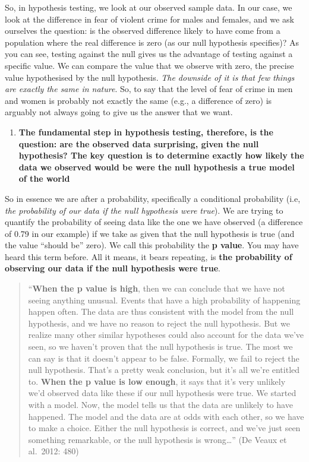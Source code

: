 \documentclass[
]{book}
\providecommand{\tightlist}{%
  \setlength{\itemsep}{0pt}\setlength{\parskip}{0pt}}
\begin{document}
So, in hypothesis testing, we look at our observed sample data. In our case, we look at the difference in fear of violent crime for males and females, and we ask ourselves the question: is the observed difference likely to have come from a population where the real difference is zero (as our null hypothesis specifies)? As you can see, testing against the null gives us the advantage of testing against a specific value. We can compare the value that we observe with zero, the precise value hypothesised by the null hypothesis. \emph{The downside of it is that few things are exactly the same in nature}. So, to say that the level of fear of crime in men and women is probably not exactly the same (e.g., a difference of zero) is arguably not always going to give us the answer that we want.

\begin{enumerate}
\def\labelenumi{\arabic{enumi}.}
\setcounter{enumi}{3}
\tightlist
\item
  \textbf{The fundamental step in hypothesis testing, therefore, is the question: are the observed data surprising, given the null hypothesis? The key question is to determine exactly how likely the data we observed would be were the null hypothesis a true model of the world}
\end{enumerate}

So in essence we are after a probability, specifically a conditional probability (i.e, \emph{the probability of our data if the null hypothesis were true}). We are trying to quantify the probability of seeing data like the one we have observed (a difference of 0.79 in our example) if we take as given that the null hypothesis is true (and the value ``should be'' zero). We call this probability the \textbf{p value}. You may have heard this term before. All it means, it bears repeating, is \textbf{the probability of observing our data if the null hypothesis were true}.

\begin{quote}
``\textbf{When the p value is high}, then we can conclude that we have not seeing anything unusual. Events that have a high probability of happening happen often. The data are thus consistent with the model from the null hypothesis, and we have no reason to reject the null hypothesis. But we realize many other similar hypotheses could also account for the data we've seen, so we haven't proven that the null hypothesis is true. The most we can say is that it doesn't appear to be false. Formally, we fail to reject the null hypothesis. That's a pretty weak conclusion, but it's all we're entitled to. \textbf{When the p value is low enough}, it says that it's very unlikely we'd observed data like these if our null hypothesis were true. We started with a model. Now, the model tells us that the data are unlikely to have happened. The model and the data are at odds with each other, so we have to make a choice. Either the null hypothesis is correct, and we've just seen something remarkable, or the null hypothesis is wrong\ldots{}'' (De Veaux et al.~2012: 480)
\end{quote}
\end{document}
